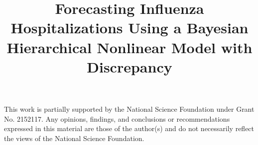 \documentclass[ba]{imsart}
\theoremstyle{plain}
\theoremstyle{definition}
\theoremstyle{remark}
\begin{document}
\begin{frontmatter}
\title{Forecasting Influenza Hospitalizations Using a Bayesian Hierarchical 
Nonlinear Model with Discrepancy}





\begin{keyword}
\end{keyword}

\end{frontmatter}






\begin{acks}[Acknowledgments]
This work is partially supported by the National Science Foundation under 
Grant No. 2152117. Any opinions, findings, and conclusions or recommendations 
expressed in this material are those of the author(s) and do not necessarily 
reflect the views of the National Science Foundation.
\end{acks}
\end{document}
